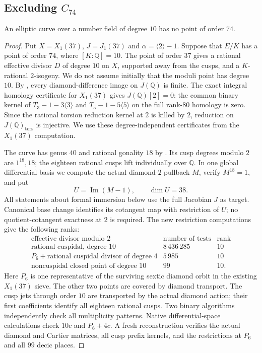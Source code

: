 \subsection{Excluding $C_{74}$}


\begin{proposition}\label{prop:decic74-exclusion}
An elliptic curve over a number field of degree $10$ has no point of order $74$.
\end{proposition}
\begin{proof}
Put $X=X_1(37)$, $J=J_1(37)$ and $\alpha=\langle2\rangle-1$.
Suppose that $E/K$ has a point of order $74$, where $[K:\mathbb Q]=10$.
The point of order $37$ gives a rational effective divisor $D$ of degree
$10$ on $X$, supported away from the cusps, and a $K$-rational
$2$-isogeny. We do not assume initially that the moduli point has degree $10$.
By \cite[Proposition~5.2 and Table~2]{DSPrime}, every diamond-difference
image on $J(\mathbb Q)$ is finite. The exact integral homology certificate
for $X_1(37)$ gives $J(\mathbb Q)[2]=0$: the common binary kernel of
$T_3-1-3\langle3\rangle$ and $T_5-1-5\langle5\rangle$ on the full
rank-$80$ homology is zero. Since the rational torsion reduction kernel
at $2$ is killed by $2$, reduction on $J(\mathbb Q)_{\mathrm{tors}}$ is
injective. We use these degree-independent certificates from the
$X_1(37)$ computation.

The curve has genus $40$ and rational gonality $18$ by
\cite[Theorem~1]{DvH}. Its cusp degrees modulo $2$ are $1^{18},18$;
the eighteen rational cusps lift individually over $\mathbb Q$.
In one global differential basis we compute the actual diamond-$2$
pullback $M$, verify $M^{18}=1$, and put
\[
 U=\operatorname{Im}(M-1),\qquad \dim U=38.
\]
All statements about formal immersion below use the full Jacobian $J$
as target. Canonical base change identifies its cotangent map with
restriction of $U$; no quotient-cotangent exactness at $2$ is required.
The new restriction computations give the following ranks:
\[
\begin{array}{c|r|c}
\text{effective divisor modulo }2&\text{number of tests}&\text{rank}\\\hline
\text{rational cuspidal, degree }10&8\,436\,285&10\\
P_6+\text{rational cuspidal divisor of degree }4&5\,985&10\\
\text{noncuspidal closed point of degree }10&99&10.
\end{array}
\]
Here $P_6$ is one representative of the surviving sextic diamond orbit
in the existing $X_1(37)$ sieve. The other two points are covered by
diamond transport. The cusp jets through order $10$ are transported
by the actual diamond action; their first coefficients identify all
eighteen rational cusps. Two binary algorithms independently check
all multiplicity patterns. Native differential-space calculations check $10c$ and $P_6+4c$.
A fresh reconstruction verifies the actual diamond and Cartier matrices,
all cusp prefix kernels, and the restrictions at $P_6$ and all $99$
decic places.


\end{proof}
